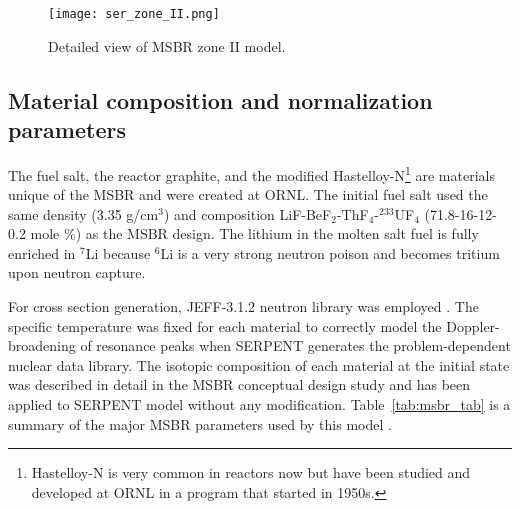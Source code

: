 \begin{figure}[hbp!] %
  \centering
  \vspace{-0.3em}
  \texttt{[image: ser\_zone\_II.png]}
  \caption{Detailed view of \gls{MSBR} zone II model.}
  \vspace{-0.6em}
  \label{fig:serpent_zoneII}
\end{figure}
\FloatBarrier

\subsection{Material composition and normalization parameters}
The fuel salt, the reactor graphite, and the modified Hastelloy-N\footnote{ Hastelloy-N is very common in reactors now but have been studied and developed at \gls{ORNL} in a program that started in 1950s.} are materials unique of the \gls{MSBR} and were created at \gls{ORNL}. The initial fuel salt used the same density (3.35 g/cm$^3$) and composition LiF-BeF$_2$-ThF$_4$-$^{233}$UF$_4$ (71.8-16-12-0.2 mole \%) as the \gls{MSBR} design\cite{robertson_conceptual_1971}. The lithium in the molten salt fuel is fully enriched in $^{7}$Li because $^{6}$Li is a very strong neutron poison and becomes tritium upon neutron capture. 

For cross section generation, JEFF-3.1.2 neutron library was employed \cite{oecd/nea_data_bank_jeff-3.1.2_2014}. The specific temperature was fixed for each material to correctly model the Doppler-broadening of resonance peaks when SERPENT generates the problem-dependent nuclear data library. The isotopic composition of each material at the initial state was described in detail in the MSBR conceptual design study \cite{robertson_conceptual_1971} and has been applied to SERPENT model without any modification. Table~\ref{tab:msbr_tab} is a summary of the major \gls{MSBR} parameters used by this model \cite{robertson_conceptual_1971}. 

